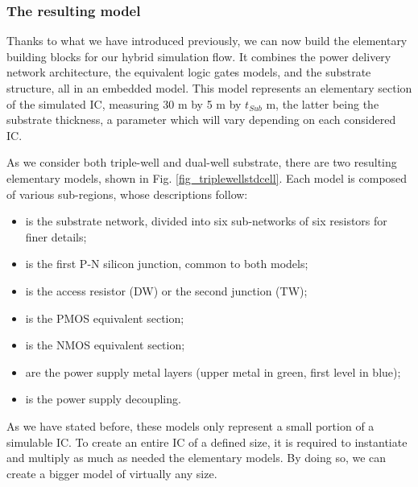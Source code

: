 	\subsubsection{The resulting model}
	Thanks to what we have introduced previously, we can now build the elementary building blocks for our hybrid simulation flow.
	It combines the power delivery network architecture, the equivalent logic gates models, and the substrate structure, all in an embedded model.
	This model represents an elementary section of the simulated IC, measuring 30 \textmu m by 5 \textmu m by $t_{Sub}$ \textmu m, the latter being the substrate thickness, a parameter which will vary depending on each considered IC.
	
	As we consider both triple-well and dual-well substrate, there are two resulting elementary models, shown in Fig. \ref{fig_triplewellstdcell}.
	Each model is composed of various sub-regions, whose descriptions follow:
	\begin{itemize}
		\item {} is the substrate network, divided into six sub-networks of six resistors for finer details;
		\item {} is the first P-N silicon junction, common to both models;
		\item {} is the access resistor (DW) or the second junction (TW);
		\item {} is the PMOS equivalent section;
		\item {} is the NMOS equivalent section;
		\item {} are the power supply metal layers (upper metal in green, first level in blue);
		\item {} is the power supply decoupling.
	\end{itemize}
	As we have stated before, these models only represent a small portion of a simulable IC.
	To create an entire IC of a defined size, it is required to instantiate and multiply as much as needed the elementary models.
	By doing so, we can create a bigger model of virtually any size.
